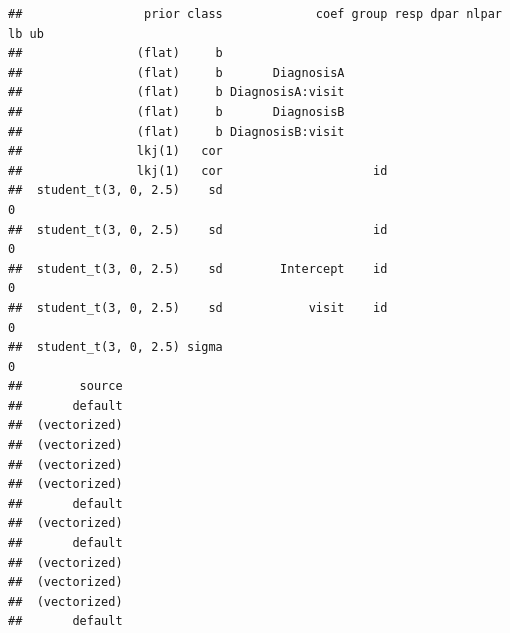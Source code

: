 \documentclass[
]{article}
\begin{document}
\begin{verbatim}
##                 prior class             coef group resp dpar nlpar lb ub
##                (flat)     b                                             
##                (flat)     b       DiagnosisA                            
##                (flat)     b DiagnosisA:visit                            
##                (flat)     b       DiagnosisB                            
##                (flat)     b DiagnosisB:visit                            
##                lkj(1)   cor                                             
##                lkj(1)   cor                     id                      
##  student_t(3, 0, 2.5)    sd                                         0   
##  student_t(3, 0, 2.5)    sd                     id                  0   
##  student_t(3, 0, 2.5)    sd        Intercept    id                  0   
##  student_t(3, 0, 2.5)    sd            visit    id                  0   
##  student_t(3, 0, 2.5) sigma                                         0   
##        source
##       default
##  (vectorized)
##  (vectorized)
##  (vectorized)
##  (vectorized)
##       default
##  (vectorized)
##       default
##  (vectorized)
##  (vectorized)
##  (vectorized)
##       default
\end{verbatim}
\end{document}
